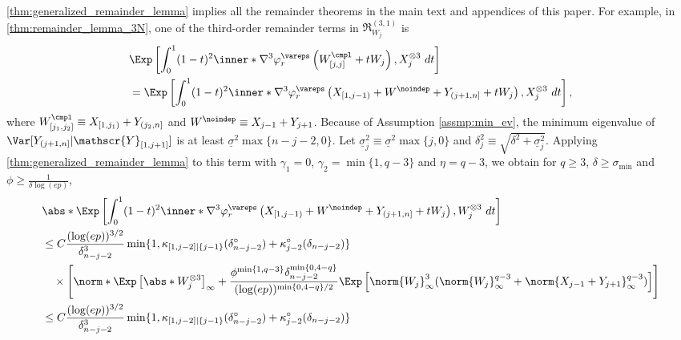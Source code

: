 \documentclass[aos]{imsart}
\begin{document}
\begin{appendix}
\cref{thm:generalized_remainder_lemma} implies all the remainder theorems in the main text and appendices of this paper. For example, in \cref{thm:remainder_lemma_3N}, one of the third-order remainder terms in $\mathfrak{R}^{(3,1)}_{W_j}$ is
\begin{equation*}
\begin{aligned}
    & \Exp\left[ \int_0^1 (1-t)^2 \inner*{
        \nabla^3 \varphi_r^\vareps\left(
            W^\cmpl_{[j,j]} + t W_j
        \right),
        X_j^{\otimes 3}} ~dt 
    \right] \\
    & = \Exp\left[ \int_0^1 (1-t)^2 \inner*{
        \nabla^3 \varphi_r^\vareps\left(
            X_{[1,j-1)} + W^\noindep + Y_{(j+1,n]} + t W_j
        \right),
        X_j^{\otimes 3}} ~dt
    \right],
\end{aligned}
\end{equation*}
where $W_{[j_1,j_2]}^\cmpl \equiv X_{[1,j_1)} + Y_{(j_2,n]}$ and $W^\noindep \equiv X_{j-1} + Y_{j+1}$. Because of Assumption \eqref{assmp:min_ev}, the minimum eigenvalue of $\Var[Y_{(j+1,n]} | \mathscr{Y}_{[1,j+1]}]$ is at least $\underline{\sigma}^2 \max\{n-j-2,0\}$.
Let $\underline{\sigma}_{j}^2 \equiv \underline{\sigma}^2 \max\{j, 0\}$ and $\delta_{j}^2 \equiv \sqrt{\delta^2 + \underline{\sigma}_{j}^2}$. 
Applying \cref{thm:generalized_remainder_lemma} to this term with $\gamma_1 = 0$, $\gamma_2 = \min\{1, q-3\}$ and $\eta = q-3$, we obtain for $q \geq 3$, $\delta \geq \sigma_{\min}$ and $\phi \geq \frac{1}{\delta\log(ep)}$,
\begin{equation*}
\begin{aligned}
    & \abs*{ \Exp\left[ \int_0^1 (1-t)^2 \inner*{
        \nabla^3 \varphi_r^\vareps\left(
            X_{[1,j-1)} + W^\noindep + Y_{(j+1,n]} + t W_j
        \right),
        W_j^{\otimes 3}} ~dt
    \right] } \\
    & \leq C \frac{(\log(ep))^{3/2}}{\delta_{n-j-2}^3} 
        \min\{1, \kappa_{[1,j-2]|\{j-1\}}(\delta_{n-j-2}^\circ) + \kappa^\circ_{j-2}(\delta_{n-j-2})\} \\
    & \quad \times \left[ 
        \norm*{\Exp\left[
            \abs*{W_j^{\otimes 3}}
        \right]}_\infty
        + \frac{\phi^{\min\{1,q-3\}} \delta_{n-j-2}^{\min\{0,4-q\}}}{(\log(ep))^{\min\{0,4-q\}/2}} \Exp\left[ 
            \norm{W_j}_\infty^3
            (\norm{W_j}_\infty^{q-3} + \norm{X_{j-1}+Y_{j+1}}_\infty^{q-3}) 
        \right]
    \right] \\
    & \leq C \frac{(\log(ep))^{3/2}}{\delta_{n-j-2}^3} 
    \min\{1, \kappa_{[1,j-2]|\{j-1\}}(\delta_{n-j-2}^\circ) + \kappa^\circ_{j-2}(\delta_{n-j-2})\} \\

\end{aligned}
\end{equation*}
\end{appendix}
\end{document}
